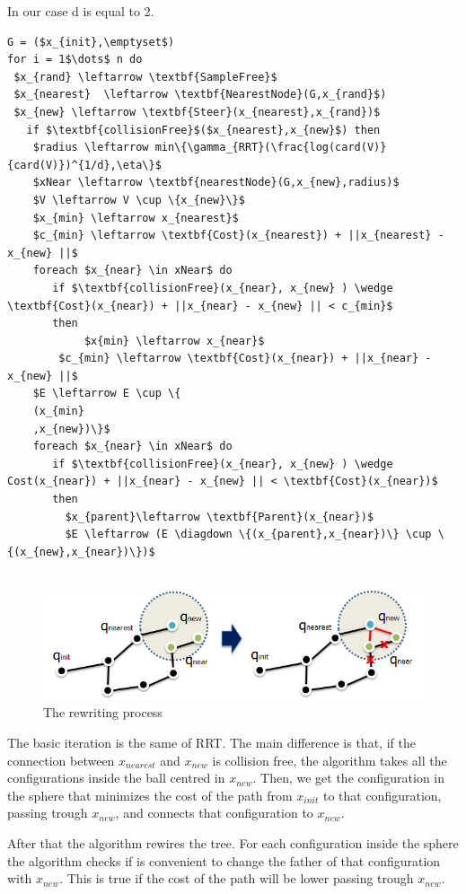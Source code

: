 \documentclass[10pt]{article}
\begin{document}
	In our case d is equal to 2.
	\newpage
		\begin{lstlisting}[frame=single, mathescape=true,caption={RRT*}]
G = ($x_{init},\emptyset$)
for i = 1$\dots$ n do
 $x_{rand} \leftarrow \textbf{SampleFree}$
 $x_{nearest}  \leftarrow \textbf{NearestNode}(G,x_{rand}$)
 $x_{new} \leftarrow \textbf{Steer}(x_{nearest},x_{rand})$	
   if $\textbf{collisionFree}$($x_{nearest},x_{new}$) then
	$radius \leftarrow min\{\gamma_{RRT}(\frac{log(card(V)}{card(V)})^{1/d},\eta\}$
	$xNear \leftarrow \textbf{nearestNode}(G,x_{new},radius)$
	$V \leftarrow V \cup \{x_{new}\}$
	$x_{min} \leftarrow x_{nearest}$
	$c_{min} \leftarrow \textbf{Cost}(x_{nearest}) + ||x_{nearest} - x_{new} ||$
	foreach $x_{near} \in xNear$ do
	   if $\textbf{collisionFree}(x_{near}, x_{new} ) \wedge \textbf{Cost}(x_{near}) + ||x_{near} - x_{new} || < c_{min}$
	   then
	        $x{min} \leftarrow x_{near}$
		$c_{min} \leftarrow \textbf{Cost}(x_{near}) + ||x_{near} - x_{new} ||$
	$E \leftarrow E \cup \{
	(x_{min}
	,x_{new})\}$
	foreach $x_{near} \in xNear$ do
	   if $\textbf{collisionFree}(x_{near}, x_{new} ) \wedge Cost(x_{near}) + ||x_{near} - x_{new} || < \textbf{Cost}(x_{near})$
	   then
	     $x_{parent}\leftarrow \textbf{Parent}(x_{near})$
	     $E \leftarrow (E \diagdown \{(x_{parent},x_{near})\} \cup \{(x_{new},x_{near})\})$
	
	\end{lstlisting}
	\FloatBarrier
	\begin{figure}[hbt]
		\centering
		\includegraphics[width=\linewidth]{rrtRew.png}
		\caption{The rewriting process}
		\label{fig:rewrite}
	\end{figure}
	\FloatBarrier
	The basic iteration is the same of RRT. The main difference is that, if the connection between $x_{nearest}$ and $x_{new}$ is collision free, the algorithm takes all the configurations inside the ball centred in $x_{new}$. Then, we get the configuration in the sphere that minimizes the cost of the path from $x_{init}$ to that configuration, passing trough $x_{new}$, and connects that configuration to $x_{new}$.
	
	After that the algorithm rewires the tree. For each configuration inside the sphere the algorithm checks if is convenient to change the father of that configuration with $x_{new}$. This is true if the cost of the path will be lower passing trough $x_{new}$.
	
\end{document}
